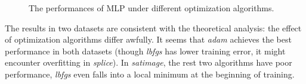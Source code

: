 \documentclass[12pt,a4paper]{article}
\theoremstyle{definition}
\begin{document}
\begin{figure}[H]
	\centering
	\caption{The performances of MLP under different optimization algorithms.}
	\label{fig:mlp-optimizer}
\end{figure}

The results in two datasets are consistent with the theoretical analysis: the effect of optimization algorithms differ awfully. It seems that \textit{adam} achieves the best performance in both datasets (though \textit{lbfgs} has lower training error, it might encounter overfitting in \textit{splice}). In \textit{satimage}, the rest two algorithms have poor performance, \textit{lbfgs} even falls into a local minimum at the beginning of training.
\end{document}
